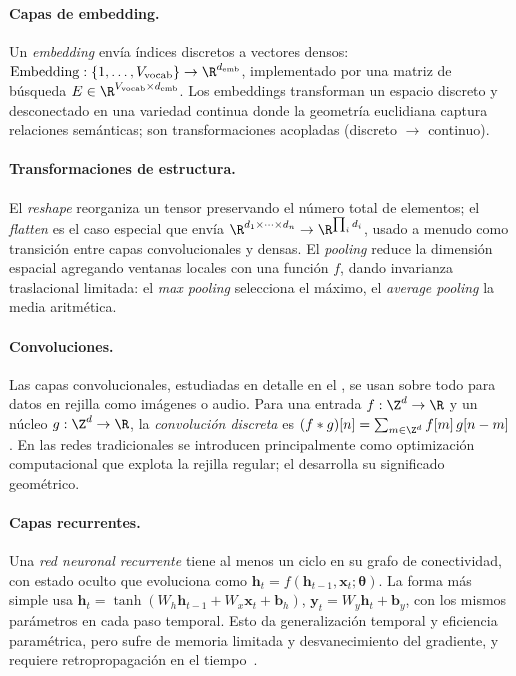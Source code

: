 \paragraph{Capas de embedding.}
Un \emph{embedding} env\'ia \'indices discretos a vectores densos:
$\mathrm{Embedding} : \{1, \ldots, V_{\mathrm{vocab}}\} \to \R^{d_{\mathrm{emb}}}$,
implementado por una matriz de b\'usqueda
$E \in \R^{V_{\mathrm{vocab}} \times d_{\mathrm{emb}}}$. Los embeddings
transforman un espacio discreto y desconectado en una variedad continua donde la
geometr\'ia euclidiana captura relaciones sem\'anticas; son transformaciones
acopladas (discreto $\to$ continuo).

\paragraph{Transformaciones de estructura.}
El \emph{reshape} reorganiza un tensor preservando el n\'umero total de elementos;
el \emph{flatten} es el caso especial que env\'ia $\R^{d_1 \times \cdots \times
d_n} \to \R^{\prod_i d_i}$, usado a menudo como transici\'on entre capas
convolucionales y densas. El \emph{pooling} reduce la dimensi\'on espacial
agregando ventanas locales con una funci\'on $f$, dando invarianza traslacional
limitada: el \emph{max pooling} selecciona el m\'aximo, el \emph{average pooling}
la media aritm\'etica.

\paragraph{Convoluciones.}
Las capas convolucionales, estudiadas en detalle en el , se usan
sobre todo para datos en rejilla como im\'agenes o audio. Para una entrada $f :
\Z^d \to \R$ y un n\'ucleo $g : \Z^d \to \R$, la \emph{convoluci\'on discreta} es
$(f * g)[n] = \sum_{m \in \Z^d} f[m]\, g[n - m]$. En las redes tradicionales se
introducen principalmente como optimizaci\'on computacional que explota la rejilla
regular; el  desarrolla su significado geom\'etrico.

\paragraph{Capas recurrentes.}
Una \emph{red neuronal recurrente} tiene al menos un ciclo en su grafo de
conectividad, con estado oculto que evoluciona como $\mathbf{h}_t =
f(\mathbf{h}_{t-1}, \mathbf{x}_t; \boldsymbol{\theta})$. La forma m\'as simple usa
$\mathbf{h}_t = \tanh(W_h \mathbf{h}_{t-1} + W_x \mathbf{x}_t + \mathbf{b}_h)$,
$\mathbf{y}_t = W_y \mathbf{h}_t + \mathbf{b}_y$, con los mismos par\'ametros en
cada paso temporal. Esto da generalizaci\'on temporal y eficiencia param\'etrica,
pero sufre de memoria limitada y desvanecimiento del gradiente, y requiere
retropropagaci\'on en el tiempo~\citep{werbos1990bptt}.

